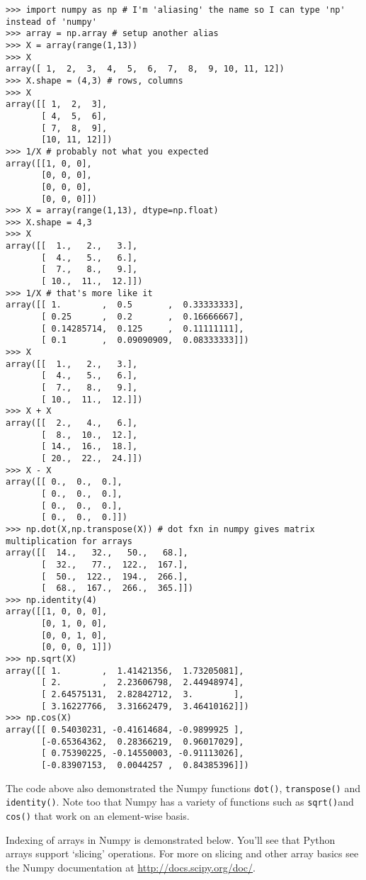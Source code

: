 \documentclass{article}
\begin{document}
\begin{lstlisting}
>>> import numpy as np # I'm 'aliasing' the name so I can type 'np' instead of 'numpy'
>>> array = np.array # setup another alias
>>> X = array(range(1,13))
>>> X
array([ 1,  2,  3,  4,  5,  6,  7,  8,  9, 10, 11, 12])
>>> X.shape = (4,3) # rows, columns
>>> X
array([[ 1,  2,  3],
       [ 4,  5,  6],
       [ 7,  8,  9],
       [10, 11, 12]])
>>> 1/X # probably not what you expected
array([[1, 0, 0],
       [0, 0, 0],
       [0, 0, 0],
       [0, 0, 0]])
>>> X = array(range(1,13), dtype=np.float)
>>> X.shape = 4,3
>>> X
array([[  1.,   2.,   3.],
       [  4.,   5.,   6.],
       [  7.,   8.,   9.],
       [ 10.,  11.,  12.]])
>>> 1/X # that's more like it
array([[ 1.        ,  0.5       ,  0.33333333],
       [ 0.25      ,  0.2       ,  0.16666667],
       [ 0.14285714,  0.125     ,  0.11111111],
       [ 0.1       ,  0.09090909,  0.08333333]])
>>> X
array([[  1.,   2.,   3.],
       [  4.,   5.,   6.],
       [  7.,   8.,   9.],
       [ 10.,  11.,  12.]])
>>> X + X
array([[  2.,   4.,   6.],
       [  8.,  10.,  12.],
       [ 14.,  16.,  18.],
       [ 20.,  22.,  24.]])
>>> X - X
array([[ 0.,  0.,  0.],
       [ 0.,  0.,  0.],
       [ 0.,  0.,  0.],
       [ 0.,  0.,  0.]])
>>> np.dot(X,np.transpose(X)) # dot fxn in numpy gives matrix multiplication for arrays
array([[  14.,   32.,   50.,   68.],
       [  32.,   77.,  122.,  167.],
       [  50.,  122.,  194.,  266.],
       [  68.,  167.,  266.,  365.]])
>>> np.identity(4)
array([[1, 0, 0, 0],
       [0, 1, 0, 0],
       [0, 0, 1, 0],
       [0, 0, 0, 1]])
>>> np.sqrt(X)
array([[ 1.        ,  1.41421356,  1.73205081],
       [ 2.        ,  2.23606798,  2.44948974],
       [ 2.64575131,  2.82842712,  3.        ],
       [ 3.16227766,  3.31662479,  3.46410162]])
>>> np.cos(X)
array([[ 0.54030231, -0.41614684, -0.9899925 ],
       [-0.65364362,  0.28366219,  0.96017029],
       [ 0.75390225, -0.14550003, -0.91113026],
       [-0.83907153,  0.0044257 ,  0.84385396]])
\end{lstlisting}
The code above also demonstrated the Numpy functions \lstinline!dot()!,
\lstinline!transpose()! and \lstinline!identity()!. Note too that Numpy
has a variety of functions such as \lstinline!sqrt()!and
\lstinline!cos()! that work on an element-wise basis.

Indexing of arrays in Numpy is demonstrated below. You'll see that
Python arrays support `slicing' operations. For more on slicing and
other array basics see the Numpy documentation at
\href{http://docs.scipy.org/doc/}{http://docs.scipy.org/doc/}.
\end{document}
